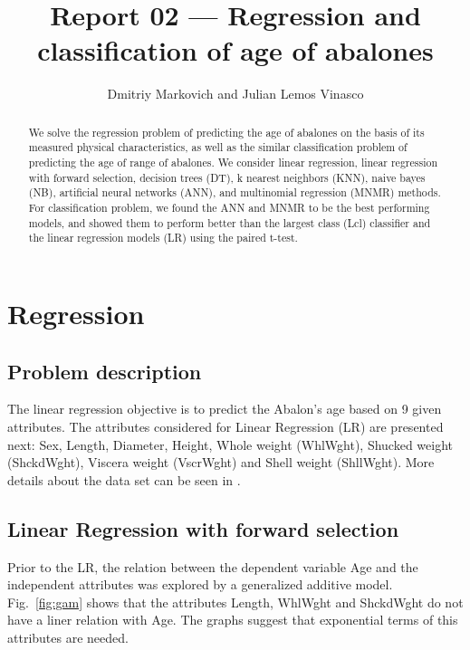 \documentclass[10pt, paper=a4]{article}
\begin{document}
\title{Report 02 --- Regression and classification of age of abalones}

\author{Dmitriy Markovich and Julian Lemos Vinasco}

\date{}

\maketitle

\begin{abstract}
  We solve the regression problem of predicting the age of abalones on
  the basis of its measured physical characteristics, as well as the
  similar classification problem of predicting the age of range of
  abalones.  We consider linear regression, linear regression with
  forward selection, decision trees (DT), k nearest neighbors (KNN),
  naive bayes (NB), artificial neural networks (ANN), and multinomial
  regression (MNMR) methods.  For classification problem, we found the
  ANN and MNMR to be the best performing models, and showed them to
  perform better than the largest class (Lcl) classifier and the linear regression models (LR) using the paired t-test.
\end{abstract}

\section{Regression}
\label{sec:regression}

\subsection{Problem description}
The linear regression objective is to predict the Abalon's age based
on 9 given attributes. The attributes considered for Linear Regression
(LR) are presented next: Sex, Length, Diameter, Height, Whole weight
(WhlWght), Shucked weight (ShckdWght), Viscera weight (VscrWght) and
Shell weight (ShllWght). More details about the data set can be seen
in \cite{datadescription}.

\subsection{Linear Regression with forward selection}
Prior to the LR, the relation between the dependent variable Age and
the independent attributes was explored by a generalized additive
model. Fig.~\ref{fig:gam} shows that the attributes Length, WhlWght
and ShckdWght do not have a liner relation with Age. The graphs
suggest that exponential terms of this attributes are needed.
\end{document}
